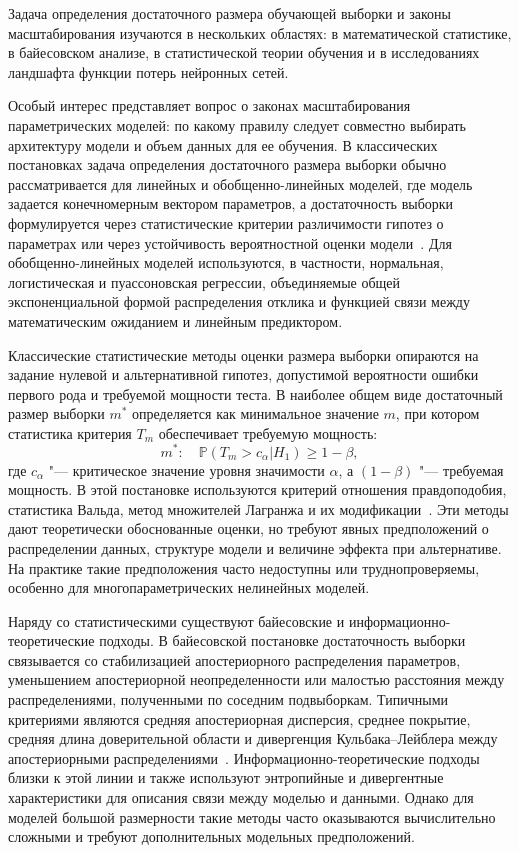 {\progress} Задача определения достаточного размера обучающей выборки и законы масштабирования изучаются в нескольких областях: в математической статистике, в байесовском анализе, в статистической теории обучения и в исследованиях ландшафта функции потерь нейронных сетей.

Особый интерес представляет вопрос о законах масштабирования параметрических моделей: по какому правилу следует совместно выбирать архитектуру модели и объем данных для ее обучения. В классических постановках задача определения достаточного размера выборки обычно рассматривается для линейных и обобщенно-линейных моделей, где модель задается конечномерным вектором параметров, а достаточность выборки формулируется через статистические критерии различимости гипотез о параметрах или через устойчивость вероятностной оценки модели~\cite{self1988,self1992,shieh2000,shieh2005,demidenko2007,motrenko2014}. Для обобщенно-линейных моделей используются, в частности, нормальная, логистическая и пуассоновская регрессии, объединяемые общей экспоненциальной формой распределения отклика и функцией связи между математическим ожиданием и линейным предиктором.

Классические статистические методы оценки размера выборки опираются на задание нулевой и альтернативной гипотез, допустимой вероятности ошибки первого рода и требуемой мощности теста. В наиболее общем виде достаточный размер выборки $m^*$ определяется как минимальное значение $m$, при котором статистика критерия $T_m$ обеспечивает требуемую мощность:
\[
    m^*:\quad \mathbb P(T_m > c_\alpha | H_1)\ge 1-\beta,
\]
где $c_\alpha$ "--- критическое значение уровня значимости $\alpha$, а $(1-\beta)$ "--- требуемая мощность. В этой постановке используются критерий отношения правдоподобия, статистика Вальда, метод множителей Лагранжа и их модификации~\cite{self1988,self1992,shieh2000,shieh2005,demidenko2007}. Эти методы дают теоретически обоснованные оценки, но требуют явных предположений о распределении данных, структуре модели и величине эффекта при альтернативе. На практике такие предположения часто недоступны или труднопроверяемы, особенно для многопараметрических нелинейных моделей.

Наряду со статистическими существуют байесовские и информационно-теоретические подходы. В байесовской постановке достаточность выборки связывается со стабилизацией апостериорного распределения параметров, уменьшением апостериорной неопределенности или малостью расстояния между распределениями, полученными по соседним подвыборкам. Типичными критериями являются средняя апостериорная дисперсия, среднее покрытие, средняя длина доверительной области и дивергенция Кульбака--Лейблера между апостериорными распределениями~\cite{lindley1997,rubin1998,wang2002,motrenko2014}. Информационно-теоретические подходы близки к этой линии и также используют энтропийные и дивергентные характеристики для описания связи между моделью и данными. Однако для моделей большой размерности такие методы часто оказываются вычислительно сложными и требуют дополнительных модельных предположений.

